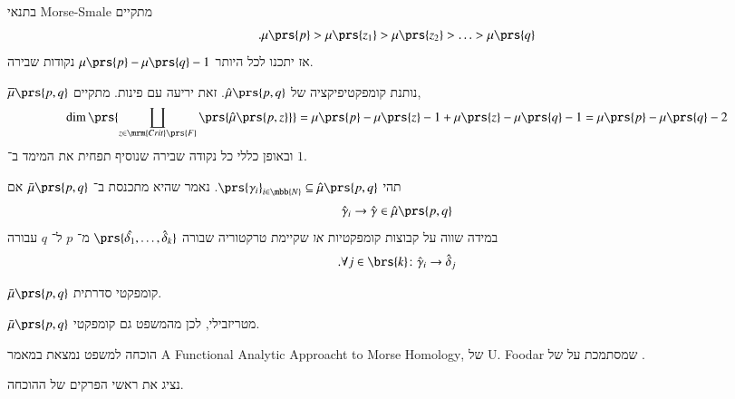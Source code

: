 \documentclass[a4paper,10pt,twoside,openany]{book}
\begin{document}
\begin{remark}
בתנאי
\textenglish{Morse-Smale}
מתקיים
\[\text{.} \mu\prs{p} > \mu\prs{z_1} > \mu\prs{z_2} > \ldots > \mu\prs{q}\]
אז יתכנו לכל היותר
$\mu\prs{p} - \mu\prs{q} - 1$
נקודות שבירה.
\end{remark}

\begin{remark}
$\overline{\mu}\prs{p,q}$
נותנת קומפקטיפיקציה של
$\hat{\mu}\prs{p,q}$.
זאת יריעה עם פינות.
מתקיים,
\[\dim\prs{\coprod_{z \in \mrm{Crit}\prs{F}} \prs{\hat{\mu}\prs{p,z}}} = \mu\prs{p} - \mu\prs{z} - 1 + \mu\prs{z} - \mu\prs{q} - 1 = \mu\prs{p} - \mu\prs{q} - 2\]
ובאופן כללי כל נקודה שבירה שנוסיף תפחית את המימד ב־%
$1$.
\end{remark}

\begin{definition}[התכנסות]
תהי
$\prs{\gamma_i}_{i \in \mbb{N}} \subseteq \hat{\mu}\prs{p,q}$.
נאמר שהיא מתכנסת ב־%
$\bar{\mu}\prs{p,q}$
אם
\[\hat{\gamma}_i \to \hat{\gamma}\in \hat{\mu}\prs{p,q}\]
במידה שווה על קבוצות קומפקטיות
\emph{או}
שקיימת טרקטוריה שבורה
$\prs{\hat{\delta_1}, \ldots, \hat{\delta}_k}$
מ־%
$p$
ל־%
$q$
עבורה
\[\text{.} \forall j \in \brs{k} \colon \hat{\gamma}_i \to \hat{\delta}_j\]
\end{definition}

\begin{theorem}
$\bar{\mu}\prs{p,q}$
קומפקטי סדרתית.
\end{theorem}

\begin{corollary}
$\bar{\mu}\prs{p,q}$
מטריזבילי, לכן מהמשפט גם קומפקטי.
\end{corollary}

הוכחה למשפט נמצאת במאמר
\textenglish{A Functional Analytic Approacht to Morse Homology},
של
\textenglish{U. Foodar}
שמסתמכת על
של
.

נציג את ראשי הפרקים של ההוכחה.
\end{document}

